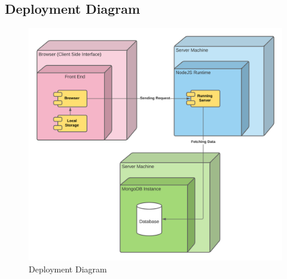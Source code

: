 \subsection{Deployment Diagram}
\begin{figure}[H]
    \centering
    \includegraphics[scale=0.6]{./diagrams/deployment-diagram.png}
    \caption{Deployment Diagram}
    \label{fig:deployment}
\end{figure}
